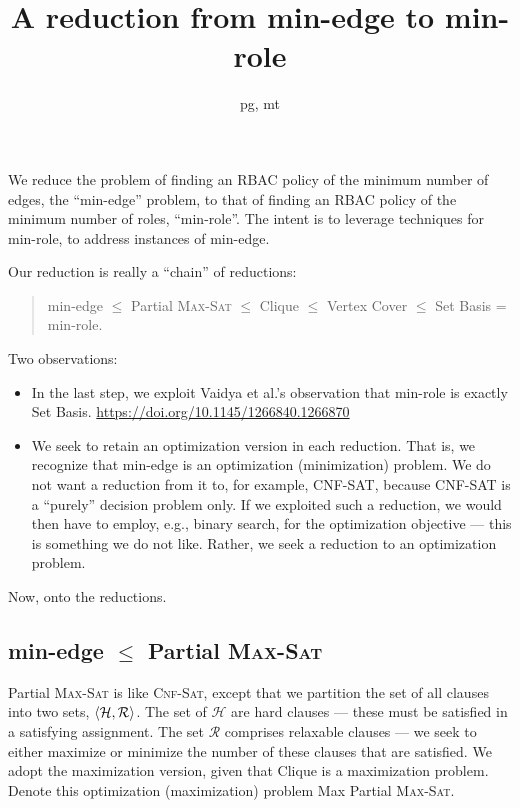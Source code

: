 \documentclass[11pt,onecolumn]{article}
\title{A reduction from min-edge to min-role}
\author{pg, mt}
\date{}
\newcommand{\tuple}[1]{\ensuremath{\left\langle #1 \right\rangle}\xspace}
\let\originalleft\left
\let\originalright\right
\renewcommand{\left}{\mathopen{}\mathclose\bgroup\originalleft}
\renewcommand{\right}{\aftergroup\egroup\originalright}
\begin{document}
\maketitle

\noindent
We reduce the problem of finding an RBAC policy of the minimum number of edges, the ``min-edge'' problem, to that of finding an RBAC policy of the minimum number of roles, ``min-role''. The intent is to leverage techniques for min-role, to address instances of min-edge.

\vspace*{0.125in}
\noindent
Our reduction is really a ``chain'' of reductions:

\begin{quote}
	min-edge $\le$ Partial \textsc{Max-Sat} $\le$ Clique $\le$ Vertex Cover $\le$ Set Basis = min-role.
\end{quote}


\vspace*{0.125in}
\noindent
Two observations:
\begin{itemize}
\item In the last step, we exploit Vaidya et al.'s observation that min-role is exactly Set Basis. \url{https://doi.org/10.1145/1266840.1266870}
\item We seek to retain an optimization version in each reduction. That is, we recognize that min-edge is an optimization (minimization) problem. We do not want a reduction from it to, for example, CNF-SAT, because CNF-SAT is a ``purely'' decision problem only. If we exploited such a reduction, we would then have to employ, e.g., binary search, for the optimization objective --- this is something we do not like. Rather, we seek a reduction to an optimization problem.
\end{itemize}


\vspace*{0.125in}
\noindent
Now, onto the reductions.

\subsection*{min-edge $\le$ Partial \textsc{Max-Sat}}

\vspace*{0.125in}
\noindent
Partial \textsc{Max-Sat} is like \textsc{Cnf-Sat}, except that we partition the set of all clauses into two sets, $\tuple{\mathcal{H}, \mathcal{R}}$. The set of $\mathcal{H}$ are hard clauses --- these must be satisfied in a satisfying assignment. The set $\mathcal{R}$ comprises relaxable clauses --- we seek to either maximize or minimize the number of these clauses that are satisfied. We adopt the maximization version, given that Clique is a maximization problem. Denote this optimization (maximization) problem Max Partial \textsc{Max-Sat}.
\end{document}
